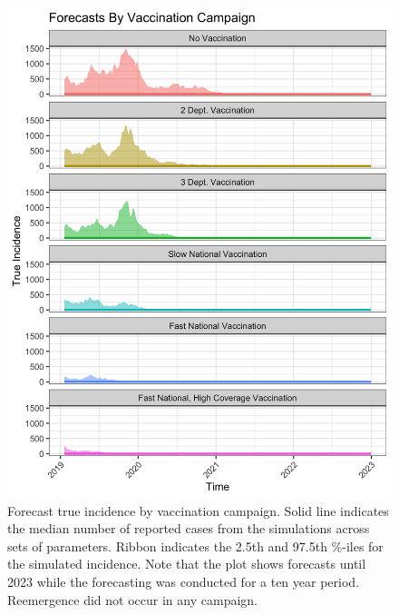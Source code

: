 \documentclass[12pt]{article}
\begin{document}
\begin{figure}[H]
  \centering
  \includegraphics[width=150mm]{incid_plot.png}
  \caption{Forecast true incidence by vaccination campaign. Solid line indicates the median number of reported cases from the simulations across sets of parameters. Ribbon indicates the 2.5th and 97.5th \%-iles for the simulated incidence. Note that the plot shows forecasts until 2023 while the forecasting was conducted for a ten year period. Reemergence did not occur in any campaign.}
\end{figure}
\end{document}
